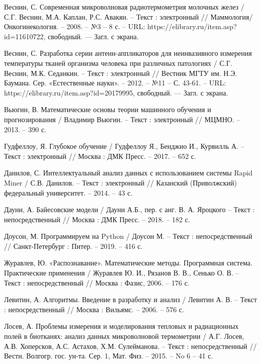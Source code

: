 \begin{thebibliography}{3}
	 Веснин, С. Современная микроволновая радиотермометрия молочных желез / С.Г. Веснин, М.А. Каплан, Р.С. Авакян. -- Текст : электронный // Маммология/Онкогинекология. -- 2008. -- №3 -- 8 с. -- URL: https://elibrary.ru/item.asp?id=11610722, свободный. — Загл. с экрана.
	
	 Веснин, С. Разработка серии антенн-аппликаторов для неинвазивного измерения температуры тканей организма человека при различных патологиях / С.Г. Веснин, М.К. Седанкин. -- Текст : электронный // Вестник МГТУ им. Н.Э. Баумана. Сер. «Естественные науки». -- 2012. -- №11 -- С. 43-61. -- URL: https://elibrary.ru/item.asp?id=20179995, свободный. — Загл. с экрана.
	
	 Вьюгин, В. Математические основы теории машинного обучения и прогнозирования / Владимир Вьюгин. -- Текст : электронный // МЦМНО. -- 2013. -- 390 с.
	
	 Гудфеллоу, Я.  Глубокое обучение / Гудфеллоу Я., Бенджио И., Курвилль А. -- Текст : электронный // Москва : ДМК Пресс. -- 2017. -- 652 с.	
	
	 Данилов, С.  Интеллектуальный анализ данных с использованием системы Rapid
	Miner / С.В. Данилов. -- Текст : электронный // Казанский (Приволжский) федеральный университет. -- 2014. -- 43 с.			
	
	 Дауни, А. Байесовские модели / Дауни А.Б., пер. с анг. В. А. Яроцкого -- Текст : непосредственный // Москва : ДМК Пресс. -- 2018. -- 182 с.				
	
	 Доусон, М. Программируем на Python / Доусон М. -- Текст : непосредственный // Санкт-Петербург : Питер. -- 2019. -- 416 с.	
	
	 Журавлев, Ю. «Распознавание». Математические методы. Программная система. Практические применения / Журавлев Ю. И., Рязанов В. В., Сенько О. В. -- Текст : непосредственный // Москва : Фазис, 2006. -- 176 с.
	
	 Левитин, А. Алгоритмы. Введение в разработку и анализ / Левитин А. В. -- Текст : непосредственный // Москва : Вильямс. -- 2006. -- 576 с.		
	
	 Лосев, А. Проблемы измерения и моделирования тепловых и радиационных полей в биотканях: анализ данных микроволновой термометрии / А.Г. Лосев, А.В. Хоперсков, А.С. Астахов, Х.М. Сулейманова. -- Текст : непосредственный // Вестн. Волгогр. гос. ун-та. Сер. 1, Мат. Физ. -- 2015. -- No 6 -- 41 с.						
	

\end{thebibliography}
